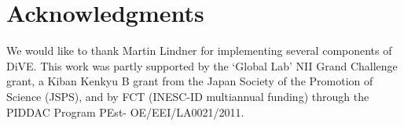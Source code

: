 \documentclass[]{elsarticle}
\begin{document}
\section*{Acknowledgments}

We would like to thank Martin Lindner for implementing several components of DiVE.
This work was partly supported by the `Global Lab' NII Grand Challenge grant, a Kiban Kenkyu B grant from the Japan Society of the Promotion of Science (JSPS), and by FCT (INESC-ID multiannual funding) through the PIDDAC Program PEst- OE/EEI/LA0021/2011.


%


\end{document}
